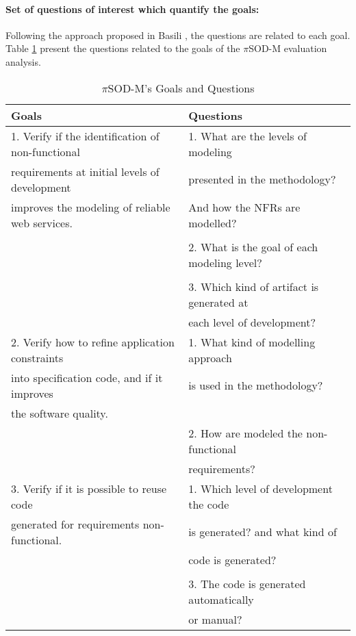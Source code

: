 \paragraph{Set of questions of interest which quantify the goals:} Following the
approach proposed in Basili \cite{basili:1985}, the questions are related to each goal. Table \ref{tab7:questions} present the questions related to the goals of the $\pi$SOD-M evaluation analysis.

\begin{table}
\centering
\caption{$\pi$SOD-M's Goals and Questions}
\label{tab7:questions}

\begin{tabular}{|l|l|}

\hline 
\hline \textbf{Goals} & \textbf{Questions} \\

\hline 1. Verify if the identification of non-functional & 1. What are the
levels of modeling  \\ 

requirements  at initial levels of development   & presented in the
methodology?  \\

 improves the modeling of reliable web services. &    And how the NFRs are
 modelled?  \\
 
 &  \\
 
 &  2. What is the goal of each modeling level?\\

&  \\
 
 &  3. Which kind of artifact is generated at\\
 & each level of development?\\
\hline
2. Verify how to refine application constraints & 1. What kind of modelling
approach\\

 into specification code, and if it improves &  is used in the methodology? \\
 
the software quality. & \\

& 2. How are modeled the non-functional\\
& requirements?\\

\hline

3. Verify if it is possible to reuse code  &1. Which level of development the code \\
generated for requirements non-functional. &  is generated?  and what kind of\\ 
 &code is generated?\\
&\\
& 3. The code is generated automatically \\
& or manual?\\


\end{tabular}
\end{table}
